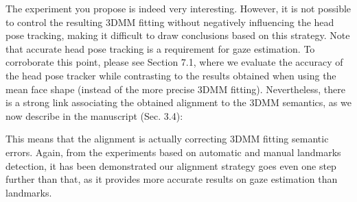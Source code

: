 {\noindent
The experiment you propose is indeed very interesting. However, it is not possible to control the resulting 3DMM fitting
without negatively influencing the head pose tracking, making it difficult to draw conclusions based on this strategy. Note that 
accurate head pose tracking is a requirement for gaze estimation. To corroborate this point, please see Section 7.1,
where we evaluate the accuracy of the head pose tracker while contrasting to the results obtained when using the mean face shape
(instead of the more precise 3DMM fitting).
Nevertheless, there is a strong link associating the obtained alignment to the 3DMM semantics, as we now describe in the manuscript (Sec. 3.4):


\noindent
This means that the alignment is actually correcting 3DMM fitting semantic errors. 
Again, from the experiments based on automatic and
manual landmarks detection, it has been demonstrated our alignment strategy goes even one step further than that,
as it provides more accurate results on gaze estimation than landmarks.






}

